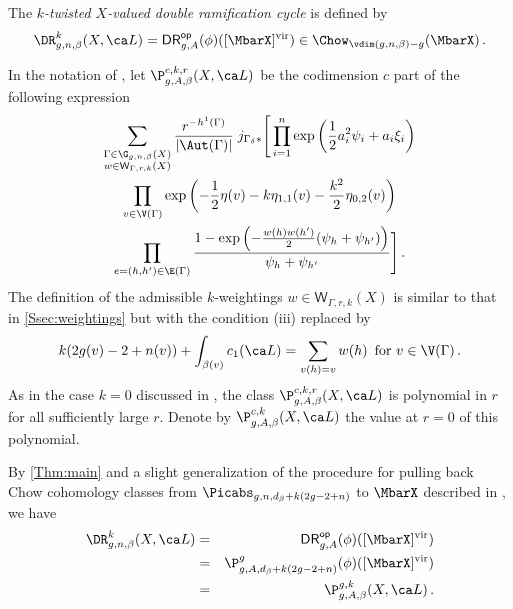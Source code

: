 \begin{definition}
\notready
The \textit{$k$-twisted $X$-valued double ramification cycle} is defined by
\[
\DR_{g,n,\beta}^{k}(X,\ca L)=\mathsf{DR}^{\mathsf{op}}_{g,A} (\phi) ( [\MbarX]^\textup{vir}) \in \Chow_{\vdim(g,n,\beta)-g}(\MbarX)\,.
\]
\end{definition}
In the notation of \cite[Section 0.4]{Janda2018Double-ramifica}, let $\P^{c,k,r}_{g,A,\beta}(X,\ca L)$ be the codimension $c$ part of the following expression
\begin{multline*}
\sum_{
\substack{\Gamma\in \G_{g,n,\beta}(X) \\
w\in \mathsf{W}_{\Gamma,r,k}(X)}
}
\frac{r^{-h^1(\Gamma)}}{|\Aut(\Gamma)| }
\;
j_{\Gamma_\delta*}\Bigg[
\prod_{i=1}^n \exp\left(\frac12 a_i^2 \psi_i + a_i \xi_i \right)\\
\prod_{v \in \V(\Gamma)} \exp\left(-\frac12 \eta(v) - k \eta_{1,1}(v) - \frac{k^2}{2} \eta_{0,2}(v)    \right)
\\
\prod_{e=(h,h')\in \E(\Gamma)}
\frac{1-\exp\left(-\frac{w(h)w(h')}2(\psi_h+\psi_{h'})\right)}{\psi_h + \psi_{h'}} \Bigg]\,.
\end{multline*}
The definition of the admissible $k$-weightings $w\in \mathsf{W}_{\Gamma,r,k}(X)$ is similar to that in \cref{Ssec:weightings} but with the condition (iii) replaced by
\[
k(2g(v)-2+n(v)) + \int_{\beta(v)} c_1(\ca L) = \sum_{v(h)=v}w(h)\,\text{ for }v \in \V(\Gamma)\, .
\]
As in the case $k=0$ discussed in \cite[Proposition 1]{Janda2018Double-ramifica}, the class $\P^{c,k,r}_{g,A,\beta}(X,\ca L)$ is polynomial in $r$ for all sufficiently large $r$.
Denote by $\P^{c,k}_{g,A,\beta}(X,\ca L)$ the value at $r=0$ of this polynomial.

By \cref{Thm:main} and a slight generalization of the procedure for pulling back Chow cohomology classes from $\Picabs_{g,n,d_\beta+k(2g-2+n)}$ to $\MbarX$ described in \cite[Section 1.5]{Janda2018Double-ramifica}, we have
\begin{eqnarray*}
    \DR_{g,n,\beta}^{k}(X,\ca L)&= &\mathsf{DR}^{\mathsf{op}}_{g,A}(\phi)( [\MbarX]^\textup{vir})\\
    &=&\P_{g,A,d_\beta+k(2g-2+n)}^g (\phi)( [\MbarX]^\textup{vir})\\
    &=&\P^{g,k}_{g,A,\beta}(X,\ca L)\, .
\end{eqnarray*}

